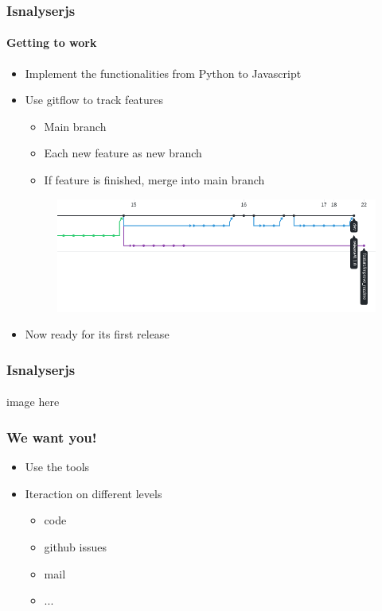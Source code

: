 \documentclass[9pt]{beamer}
\begin{document}
\begin{frame}
\frametitle{Isnalyserjs}
\framesubtitle{Getting to work}
\begin{itemize}%
	\item Implement the functionalities from Python to Javascript
	\item Use gitflow to track features
	\begin{itemize}
		\item Main branch
		\item Each new feature as new branch
		\item If feature is finished, merge into main branch 
	\end{itemize}
	\begin{figure}
	\flushleft
	\includegraphics[width=.7\linewidth]{figures/git.png}
\end{figure}
	\item Now ready for its first release
\end{itemize}
\end{frame}



\begin{frame}
\frametitle{Isnalyserjs}
\framesubtitle{}
image here
\end{frame}




\begin{frame}
\frametitle{We want you!}
\begin{itemize}%
	\item Use the tools
	\item Iteraction on different levels\\
	\begin{itemize}
		\item code
		\item github issues
		\item mail	
		\item ...
	\end{itemize}
\end{itemize}
\end{frame} 
\end{document}

